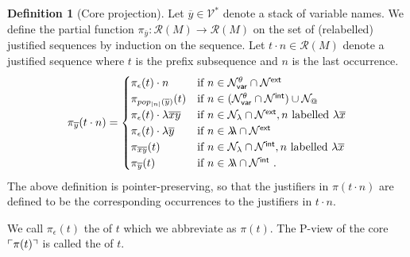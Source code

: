 \documentclass{article}
\makeatletter
\theoremstyle{definition}
\newtheorem{definition}{Definition}[section]
\newcommand\VarSet{\mathcal{V}}
\newcommand\Nodes{\mathcal{N}}%
\newcommand\NodesVar{\Nodes_{\sf var}}%
\newcommand\NodesLmd{\Nodes_\lambda}%
\newcommand\NodesApp{\Nodes_@}%
\newcommand{\ghostlmd}{{\lambda\!\!\lambda}}
\newcommand{\ghostvar}{\theta}
\newcommand\ImNodesVar{\NodesVar^\ghostvar}
\newcommand{\travulc}{\travset}
\def\coresymbol{\pi} %
\newcommand{\core}[1]{\coresymbol(#1)} %
\newcommand{\ExtNodes}{\Nodes^{\sf ext}}
\newcommand{\IntNodes}{\Nodes^{\sf int}}
\def\relabjustseqset{\mathcal{R}}
\makeatother
\begin{document}
\begin{definition}[Core projection]
\label{def:coreprojection}
Let $\overline{y} \in \VarSet^*$ denote a stack of variable names.
We define the partial function $\coresymbol_{\overline{y}}\colon \relabjustseqset(M) \longrightarrow \relabjustseqset(M)$ on the set of (relabelled) justified sequences by induction on the sequence.
Let $t \cdot n\in\relabjustseqset(M)$ denote a justified sequence where $t$ is the prefix subsequence and $n$ is the last occurrence.
\begin{equation*}
\coresymbol_{\overline{y}}(t\cdot n) =
\begin{cases}
\coresymbol_{\epsilon}(t) \cdot n
    & \mbox{if } n\in\ImNodesVar\inter\ExtNodes \\
\coresymbol_{pop_{|n|}(\overline{y})}(t)
    & \mbox{if } n\in(\ImNodesVar\inter\IntNodes)\union\NodesApp \\
\coresymbol_{\epsilon}(t) \cdot \lambda \overline{x}\overline{y}
    & \mbox{if } n\in\NodesLmd\inter\ExtNodes, n \mbox{ labelled } \lambda\overline{x}\\
\coresymbol_{\epsilon}(t) \cdot\lambda\overline{y}
    & \mbox{if } n\in\ghostlmd\inter\ExtNodes \\
\coresymbol_{\overline{x} \overline{y}}(t)
    & \mbox{if } n\in\NodesLmd\inter\IntNodes, n \mbox{ labelled } \lambda\overline{x} \\
\coresymbol_{\overline{y}}(t)
    & \mbox{if } n\in\ghostlmd\inter\IntNodes \ .
\end{cases}
\end{equation*}
The above definition is pointer-preserving, so that the justifiers in $\coresymbol(t\cdot n)$ are defined to be the corresponding occurrences to the justifiers in $t \cdot n$.


We call $\coresymbol_\epsilon(t)$ the  of $t$ which we abbreviate as $\core{t}$. The P-view of the core $\pview{\core{t}}$ is called the  of $t$.
\end{definition}
\end{document}
